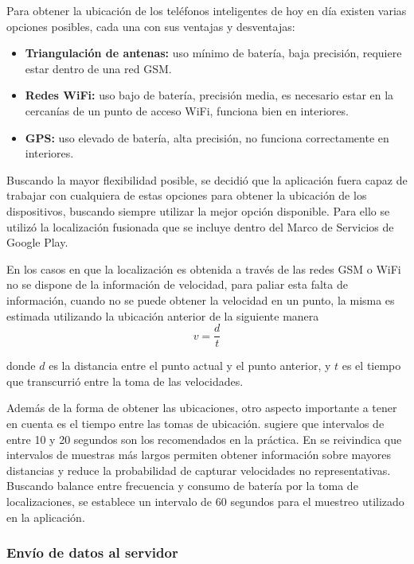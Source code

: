 Para obtener la ubicación de los teléfonos inteligentes de hoy en día existen varias opciones posibles, cada una con sus ventajas y desventajas: 
\begin{itemize}
\item \textbf{Triangulación de antenas:} uso mínimo de batería, baja precisión, requiere estar dentro de una red GSM.
\item \textbf{Redes WiFi:} uso bajo de batería, precisión media, es necesario estar en la cercanías de un punto de acceso WiFi, funciona bien en interiores.
\item \textbf{GPS:} uso elevado de batería, alta precisión, no funciona correctamente en interiores.
\end{itemize}
Buscando la mayor flexibilidad posible, se decidió que la aplicación fuera capaz de trabajar con cualquiera de estas opciones para obtener la ubicación de los dispositivos, buscando siempre utilizar la mejor opción disponible. Para ello se utilizó la localización fusionada que se incluye dentro del Marco de Servicios de Google Play.

En los casos en que la localización es obtenida a través de las redes GSM o WiFi no se dispone de la información de velocidad, para paliar esta falta de información, cuando no se puede obtener la velocidad en un punto, la misma es estimada utilizando la ubicación anterior de la siguiente manera
\begin{equation}
v=\frac { d }{ t }
\end{equation}

donde $d$ es la distancia entre el punto actual y el punto anterior, y $t$ es el tiempo que transcurrió entre la toma de las velocidades.

Además de la forma de obtener las ubicaciones, otro aspecto importante a tener en cuenta es el tiempo entre las tomas de ubicación. \cite{tao2012real} sugiere que intervalos de entre 10 y 20 segundos son los recomendados en la práctica. En \cite{fontaine2005part} se reivindica que intervalos de muestras más largos permiten obtener información sobre mayores distancias y reduce la probabilidad de capturar velocidades no representativas. Buscando balance entre frecuencia y consumo de batería por la toma de localizaciones, se establece un intervalo de 60 segundos para el muestreo utilizado en la aplicación.

\subsubsection{Envío de datos al servidor}

